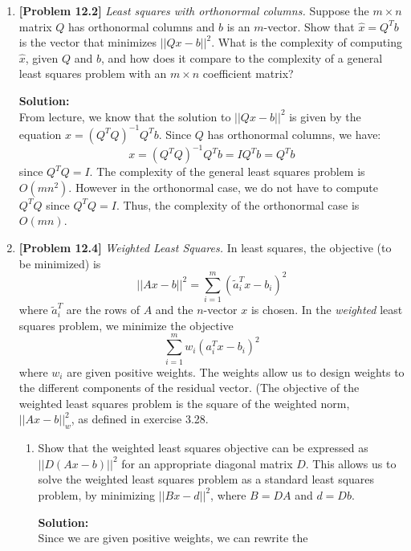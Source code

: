 \begin{enumerate}[label=(\alph*)]
	\item \textbf{[Problem 12.2]} \textit{Least squares with orthonormal columns.}
	      Suppose the $m \times n$ matrix $Q$ has orthonormal columns and $b$ is
	      an $m$-vector. Show that $\hat{x} = Q^Tb$ is the vector that minimizes
	      $ ||Qx-b||^2$. What is the complexity of computing $\hat{x}$, given
	      $Q$ and $b$, and how does it compare to the complexity of a general least
	      squares problem with an $m \times n$ coefficient matrix?
	      \begin{tcolorbox}
		      \textbf{Solution:} \\
		      From lecture, we know that the solution to $ ||Qx-b||^2$ is given
		      by the equation $x = (Q^TQ)^{-1}Q^Tb$. Since $Q$ has orthonormal
		      columns, we have:
		      $$x = (Q^TQ)^{-1}Q^Tb = IQ^Tb = Q^Tb$$
		      since $Q^TQ = I$. The complexity of the general least squares
		      problem is $O(mn^2)$. However in the orthonormal case, we do not
		      have to compute $Q^TQ$ since $Q^TQ = I$. Thus, the complexity of
		      the orthonormal case is $O(mn)$.
	      \end{tcolorbox}
	\item \textbf{[Problem 12.4]} \textit{Weighted Least Squares.}
	      In least squares, the objective (to be minimized) is
	      $$ || Ax - b||^2 = \sum_{i=1}^m (\tilde{a}_i^Tx - b_i)^2$$
	      where $\tilde{a}_i^T$ are the rows of $A$ and the $n$-vector $x$ is chosen. In
	      the \textit{weighted} least squares problem, we minimize the objective
	      $$ \sum_{i=1}^m w_i(a_i^Tx - b_i)^2$$
	      where $w_i$ are given positive weights. The weights allow us to design
	      weights to the different components of the residual vector. (The
	      objective of the weighted least squares problem is the square of the
	      weighted norm, $||Ax-b||^2_w$, as defined in exercise 3.28.
	      \begin{enumerate}[label=(\alph*)]
		      \item Show that the weighted least squares objective can be
		            expressed as $ ||D(Ax - b)||^2$ for an appropriate diagonal
		            matrix $D$. This allows us to solve the weighted least squares
		            problem as a standard least squares problem, by minimizing
		            $||Bx - d||^2$, where $B = DA$ and $d = Db$.
		            \begin{tcolorbox}
			            \textbf{Solution:} \\
			            Since we are given positive weights, we can rewrite the

\end{tcolorbox}
\end{enumerate}
\end{enumerate}
